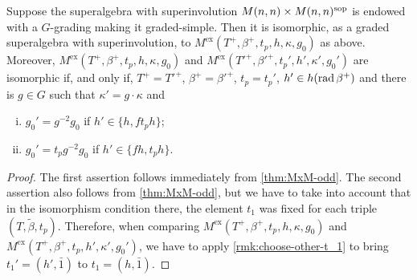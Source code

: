 \begin{cor}\label{cor:MxMsop-odd-only-G}
    Suppose the superalgebra with superinvolution $M(n,n) \times M(n,n)^{\mathrm{sop}}$ is endowed with a $G$-grading making it graded-simple. 
    Then it is isomorphic, as a graded superalgebra with superinvolution, to $M^{\mathrm{ex}}(T^+, \beta^+, t_p, h, \kappa, g_0)$ as above. 
    Moreover, $M^{\mathrm{ex}}(T^+, \beta^+, t_p, h, \kappa, g_0)$ and $M^{\mathrm{ex}} (T'^+, \beta'^+, t_p',  h', \kappa', g_0')$ are isomorphic if, and only if, $T^+ =T'^+$, $\beta^+ = \beta'^+$, $t_p = t_p'$, $h' \in h (\operatorname{rad} \beta^+)$ and there is $g \in G$ such that $\kappa' = g\cdot\kappa$ and
    \begin{enumerate}[(i)]
        \item $g_0' = g^{-2}g_0$ if $h' \in \{ h, f t_p h\}$;
        \item $g_0' = t_p g^{-2}g_0$ if $h' \in \{ f h, t_p h\}$.
    \end{enumerate}
\end{cor}

\begin{proof}
    The first assertion follows immediately from \cref{thm:MxM-odd}. 
    The second assertion also follows from \cref{thm:MxM-odd}, but we have to take into account that in the isomorphism condition there, the element $t_1$ was fixed for each triple $(T, \tilde\beta, t_p)$. 
    Therefore, when comparing $M^{\mathrm{ex}}(T^+, \beta^+, t_p, h, \kappa, g_0)$ and $M^{\mathrm{ex}} (T^+, \beta^+, t_p,  h', \kappa', g_0')$, we have to apply \cref{rmk:choose-other-t_1} to bring 
    $t_1' = (h', \bar 1)$ to $t_1= (h, \bar 1)$. 
\end{proof}



